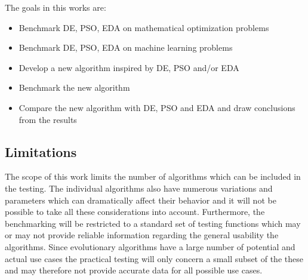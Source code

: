 The goals in this works are:
\begin{itemize}
  \item Benchmark DE, PSO, EDA on mathematical optimization problems
  \item Benchmark DE, PSO, EDA on machine learning problems
  \item Develop a new algorithm inspired by DE, PSO and/or EDA
  \item Benchmark the new algorithm
  \item Compare the new algorithm with DE, PSO and EDA and draw conclusions from the results
\end{itemize}

\subsection{Limitations}

The scope of this work limits the number of algorithms which can be included in the testing. The individual algorithms also have numerous variations and parameters which can dramatically affect their behavior and it will not be possible to take all these considerations into account. Furthermore, the benchmarking will be restricted to a standard set of testing functions which may or may not provide reliable information regarding the general usability the algorithms. Since evolutionary algorithms have a large number of potential and actual use cases the practical testing will only concern a small subset of the these and may therefore not provide accurate data for all possible use cases.
